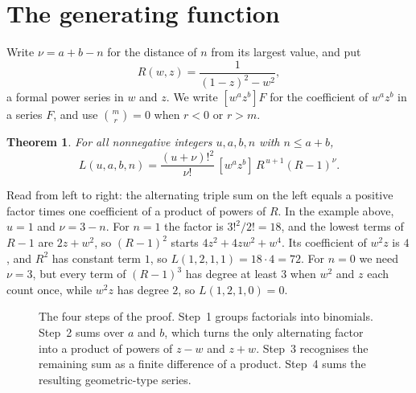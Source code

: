 \documentclass[11pt]{amsart}
\newtheorem{theorem}{Theorem}
\theoremstyle{remark}
\newcommand{\coef}[1]{[#1]}
\begin{document}
\section{The generating function}

Write $\nu=a+b-n$ for the distance of $n$ from its largest value, and put
\[
 R(w,z)=\frac1{(1-z)^2-w^2},
\]
a formal power series in $w$ and $z$. We write $\coef{w^az^b}F$ for the coefficient of $w^az^b$ in a series $F$, and use $\binom mr=0$ when $r<0$ or $r>m$.

\begin{theorem}\label{thm:main}
For all nonnegative integers $u,a,b,n$ with $n\le a+b$,
\[
 L(u,a,b,n)=\frac{(u+\nu)!^2}{\nu!}\,\coef{w^az^b}\,R^{\,u+1}(R-1)^{\nu}.
\]
\end{theorem}

Read from left to right: the alternating triple sum on the left equals a positive factor times one coefficient of a product of powers of $R$. In the example above, $u=1$ and $\nu=3-n$. For $n=1$ the factor is $3!^2/2!=18$, and the lowest terms of $R-1$ are $2z+w^2$, so $(R-1)^2$ starts $4z^2+4zw^2+w^4$. Its coefficient of $w^2z$ is $4$, and $R^2$ has constant term $1$, so $L(1,2,1,1)=18\cdot4=72$. For $n=0$ we need $\nu=3$, but every term of $(R-1)^3$ has degree at least $3$ when $w^2$ and $z$ each count once, while $w^2z$ has degree $2$, so $L(1,2,1,0)=0$.

\begin{figure}[ht]
\centering
{}
\caption{The four steps of the proof. Step~1 groups factorials into binomials. Step~2 sums over $a$ and $b$, which turns the only alternating factor into a product of powers of $z-w$ and $z+w$. Step~3 recognises the remaining sum as a finite difference of a product. Step~4 sums the resulting geometric-type series.}
\label{fig:steps}
\end{figure}
\end{document}
